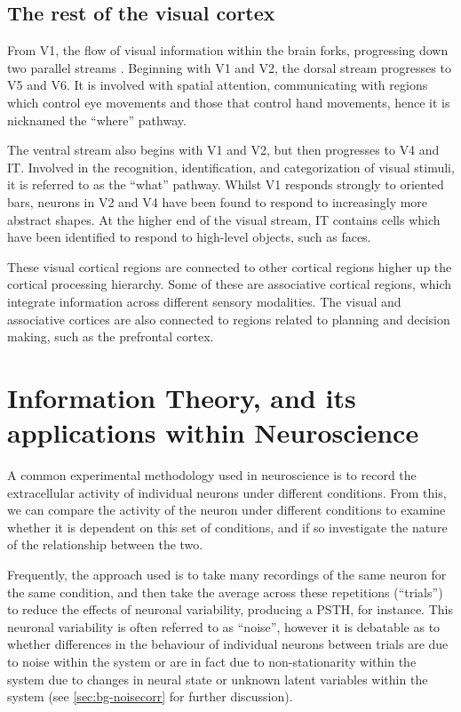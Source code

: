 \subsection{The rest of the visual cortex}

From \ac{V1}, the flow of visual information within the brain forks, progressing down two parallel streams \citep{Goodale199220,Mishkin198257}.
Beginning with \ac{V1} and \ac{V2}, the dorsal stream progresses to \ac{V5} and \ac{V6}.
It is involved with spatial attention, communicating with regions which control eye movements and those that control hand movements, hence it is nicknamed the ``where'' pathway.

The ventral stream also begins with \ac{V1} and \ac{V2}, but then progresses to \ac{V4} and \ac{IT}.
Involved in the recognition, identification, and categorization of visual stimuli, it is referred to as the ``what'' pathway.
Whilst \ac{V1} responds strongly to oriented bars, neurons in \ac{V2} and \ac{V4} have been found to respond to increasingly more abstract shapes.
At the higher end of the visual stream, \ac{IT} contains cells which have been identified to respond to high-level objects, such as faces.%

These visual cortical regions are connected to other cortical regions higher up the cortical processing hierarchy.
Some of these are associative cortical regions, which integrate information across different sensory modalities.
The visual and associative cortices are also connected to regions related to planning and decision making, such as the prefrontal cortex.


\section{Information Theory, and its applications within Neuroscience}
\label{sec:bgit}

A common experimental methodology used in neuroscience is to record the extracellular activity of individual neurons under different conditions.
From this, we can compare the activity of the neuron under different conditions to examine whether it is dependent on this set of conditions, and if so investigate the nature of the relationship between the two.

Frequently, the approach used is to take many recordings of the same neuron for the same condition, and then take the average across these repetitions (``trials'') to reduce the effects of neuronal variability, producing a \ac{PSTH}, for instance.
This neuronal variability is often referred to as ``noise'', however it is debatable as to whether differences in the behaviour of individual neurons between trials are due to noise within the system or are in fact due to non-stationarity within the system due to changes in neural state or unknown latent variables within the system (see \autoref{sec:bg-noisecorr} for further discussion).

